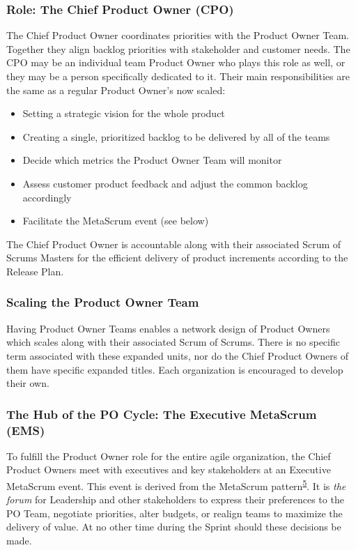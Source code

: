 \documentclass[12pt,a4paper,parskip=full]{scrartcl}
\begin{document}
\subsubsection{Role: The Chief Product Owner
(CPO)}\label{role-the-chief-product-owner}

The Chief Product Owner coordinates priorities with the Product Owner Team. Together they align backlog priorities with stakeholder and customer needs. The CPO may be an individual team Product Owner who plays this role as well, or they may be a person specifically dedicated to it. Their main responsibilities are the same as a regular Product Owner's now scaled:

\begin{itemize}
\itemsep1pt\parskip0pt
\item
  Setting a strategic vision for the whole product
\item
  Creating a single, prioritized backlog to be delivered by all of the
  teams
\item
  Decide which metrics the Product Owner Team will monitor
\item
  Assess customer product feedback and adjust the common backlog
  accordingly
\item
  Facilitate the MetaScrum event (see below)
\end{itemize}

The Chief Product Owner is accountable along with their associated Scrum
of Scrums Masters for the efficient delivery of product increments
according to the Release Plan.

\subsubsection{Scaling the Product Owner
Team}\label{scaling-the-product-owner-team}

Having Product Owner Teams enables a network design of Product Owners which scales along with their associated Scrum of Scrums. There is no specific term associated with these expanded units, nor do the Chief Product Owners of them have specific expanded titles. Each organization is encouraged to develop their own.

\subsubsection{The Hub of the PO Cycle: The Executive MetaScrum
(EMS)}\label{the-hub-of-the-po-cycle}

To fulfill the Product Owner role for the entire agile organization, the
Chief Product Owners meet with executives and key stakeholders at an
Executive MetaScrum event. This event is derived from the MetaScrum
pattern\textsuperscript{\hyperref[citation5]{5}}. It is \emph{the forum}
for Leadership and other stakeholders to express their preferences to
the PO Team, negotiate priorities, alter budgets, or realign teams to
maximize the delivery of value. At no other time during the Sprint
should these decisions be made.
\end{document}

